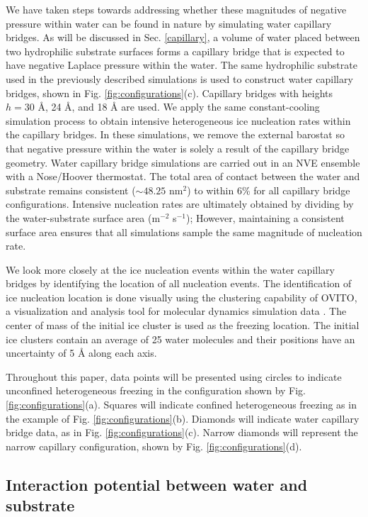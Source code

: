 \documentclass[journal abbreviation, manuscript]{copernicus}
\begin{document}
We have taken steps towards addressing whether these magnitudes of negative pressure within water can be found in nature by simulating water capillary bridges. As will be discussed in Sec. \ref{capillary}, a volume of water placed between two hydrophilic substrate surfaces forms a capillary bridge that is expected to have negative Laplace pressure within the water. The same hydrophilic substrate used in the previously described simulations is used to construct water capillary bridges, shown in Fig. \ref{fig:configurations}(c). Capillary bridges with heights $h = 30$ \AA{}, 24 \AA{}, and 18 \AA{} are used. We apply the same constant-cooling simulation process to obtain intensive heterogeneous ice nucleation rates within the capillary bridges. In these simulations, we remove the external barostat so that negative pressure within the water is solely a result of the capillary bridge geometry. Water capillary bridge simulations are carried out in an NVE ensemble with a Nose/Hoover thermostat. The total area of contact between the water and substrate remains consistent ($\sim 48.25$ nm$^2$) to within 6\% for all capillary bridge configurations. Intensive nucleation rates are ultimately obtained by dividing by the water-substrate surface area (m$^{-2}$ s$^{-1}$); However, maintaining a consistent surface area ensures that all simulations sample the same magnitude of nucleation rate.

We look more closely at the ice nucleation events within the water capillary bridges by identifying the location of all nucleation events. The identification of ice nucleation location is done visually using the clustering capability of OVITO, a visualization and analysis tool for molecular dynamics simulation data \citep{ovito}. The center of mass of the initial ice cluster is used as the freezing location. The initial ice clusters contain an average of 25 water molecules and their positions have an uncertainty of 5 \AA{} along each axis.

Throughout this paper, data points will be presented using circles to indicate unconfined heterogeneous freezing in the configuration shown by Fig. \ref{fig:configurations}(a). Squares will indicate confined heterogeneous freezing as in the example of Fig. \ref{fig:configurations}(b). Diamonds will indicate water capillary bridge data, as in Fig. \ref{fig:configurations}(c). Narrow diamonds will represent the narrow capillary configuration, shown by Fig. \ref{fig:configurations}(d).



\subsection{Interaction potential between water and substrate}
\end{document}
